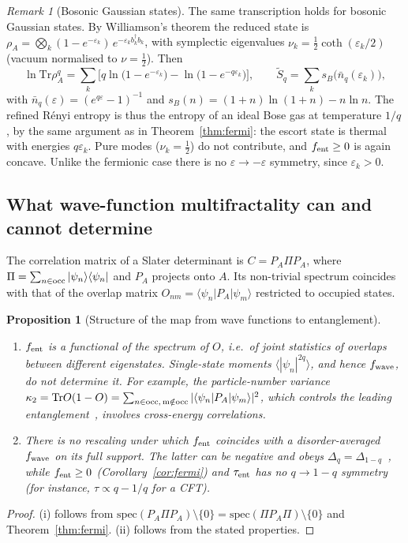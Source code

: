\documentclass[11pt]{article}
\newtheorem{proposition}{Proposition}[section]
\theoremstyle{definition}\newtheorem{definition}{Definition}[section]
\theoremstyle{remark}\newtheorem*{remark}{Remark}
\newcommand{\Tr}{\mathrm{Tr}}
\begin{document}
\begin{remark}[Bosonic Gaussian states]
The same transcription holds for bosonic Gaussian states. By Williamson's theorem the reduced state is
$\rho_A=\bigotimes_k(1-e^{-\varepsilon_k})\,e^{-\varepsilon_kb_k^\dagger b_k}$, with symplectic eigenvalues
$\nu_k=\frac12\coth(\varepsilon_k/2)$ (vacuum normalised to $\nu=\frac12$). Then
\begin{equation}
\ln\Tr\rho_A^q=\sum_k\Big[q\ln\big(1-e^{-\varepsilon_k}\big)-\ln\big(1-e^{-q\varepsilon_k}\big)\Big],\qquad
\tilde S_q=\sum_k s_B\big(\bar n_q(\varepsilon_k)\big),
\end{equation}
with $\bar n_q(\varepsilon)=(e^{q\varepsilon}-1)^{-1}$ and $s_B(n)=(1+n)\ln(1+n)-n\ln n$. The refined R\'enyi entropy is
thus the entropy of an ideal Bose gas at temperature $1/q$, by the same argument as in Theorem~\ref{thm:fermi}: the
escort state is thermal with energies $q\varepsilon_k$. Pure modes ($\nu_k=\frac12$) do not contribute, and
$f_{\rm ent}\ge0$ is again concave. Unlike the fermionic case there is no $\varepsilon\to-\varepsilon$ symmetry,
since $\varepsilon_k>0$.
\end{remark}

\subsection{What wave-function multifractality can and cannot determine}
The correlation matrix of a Slater determinant is $C=P_A\Pi P_A$, where $\Pi=\sum_{n\in\rm occ}|\psi_n\rangle\langle\psi_n|$
and $P_A$ projects onto $A$. Its non-trivial spectrum coincides with that of the overlap matrix
$O_{nm}=\langle\psi_n|P_A|\psi_m\rangle$ restricted to occupied states.

\begin{proposition}[Structure of the map from wave functions to entanglement]
\label{prop:nogo}
\begin{enumerate}
\item[(i)] $f_{\rm ent}$ is a functional of the spectrum of $O$, i.e.\ of joint statistics of overlaps between
\emph{different} eigenstates. Single-state moments $\langle|\psi_n|^{2q}\rangle$, and hence $f_{\rm wave}$, do
not determine it. For example, the particle-number variance $\kappa_2=\Tr O(1-O)=\sum_{n\in\rm occ,\,m\notin\rm occ}
|\langle\psi_n|P_A|\psi_m\rangle|^2$, which controls the leading entanglement~\cite{KlichLevitov}, involves
cross-energy correlations.
\item[(ii)] There is no rescaling under which $f_{\rm ent}$ coincides with a disorder-averaged $f_{\rm wave}$ on
its full support. The latter can be negative and obeys $\Delta_q=\Delta_{1-q}$~\cite{MFME}, while
$f_{\rm ent}\ge0$ (Corollary~\ref{cor:fermi}) and $\tau_{\rm ent}$ has no $q\to1-q$ symmetry (for instance,
$\tau\propto q-1/q$ for a CFT).
\end{enumerate}
\end{proposition}
\begin{proof}
(i) follows from $\mathrm{spec}(P_A\Pi P_A)\setminus\{0\}=\mathrm{spec}(\Pi P_A\Pi)\setminus\{0\}$ and
Theorem~\ref{thm:fermi}. (ii) follows from the stated properties.
\end{proof}
\end{document}
